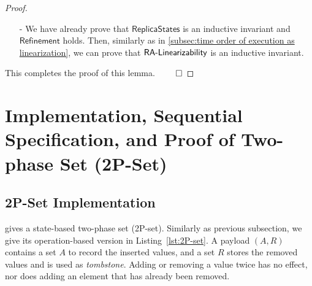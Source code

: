 \begin {proof}
\begin{itemize}
\begin{itemize}
    \item[-] Applying the query $\alabelshort[read]{}$ on the replica state $S$ should result in the same return value as applying the same query in the context of the specification on the same state $\abstate = \refmap(S)$, which again holds trivially.
    \end{itemize}

\item[-] We have already prove that $\mathsf{ReplicaStates}$ is an inductive invariant and $\mathsf{Refinement}$ holds. Then, similarly as in \sectionautorefname \ref{subsec:time order of execution as linearization}, we can prove that $\mathsf{RA\text{-}Linearizability{}}$ is an inductive invariant.
\end{itemize}

This completes the proof of this lemma. $\qed$
\end {proof}








\section{Implementation, Sequential Specification, and Proof of Two-phase Set (2P-Set)}
\label{sec:implementation, sequential specification, and proof of two-phase set (2P-set)}


\subsection{2P-Set Implementation}
\label{subsec:2P-set implementation}

\cite{ShapiroPBZ11} gives a state-based two-phase set (2P-set). Similarly as previous subsection, we give its operation-based version in Listing~\ref{lst:2P-set}. A payload $(A,R)$ contains a set $A$ to record the inserted values, and a set $R$ stores the removed values and is used as \emph{tombstone}. Adding or removing a value twice has no effect, nor does adding an element that has already been removed.


